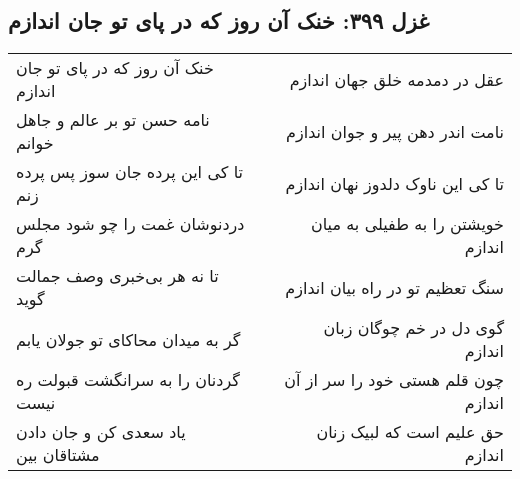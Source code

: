 \begin{center}
\section*{غزل ۳۹۹: خنک آن روز که در پای تو جان اندازم}
\label{sec:399}
\begin{longtable}{l p{0.5cm} r}
خنک آن روز که در پای تو جان اندازم
&&
عقل در دمدمه خلق جهان اندازم
\\
نامه حسن تو بر عالم و جاهل خوانم
&&
نامت اندر دهن پیر و جوان اندازم
\\
تا کی این پرده جان سوز پس پرده زنم
&&
تا کی این ناوک دلدوز نهان اندازم
\\
دردنوشان غمت را چو شود مجلس گرم
&&
خویشتن را به طفیلی به میان اندازم
\\
تا نه هر بی‌خبری وصف جمالت گوید
&&
سنگ تعظیم تو در راه بیان اندازم
\\
گر به میدان محاکای تو جولان یابم
&&
گوی دل در خم چوگان زبان اندازم
\\
گردنان را به سرانگشت قبولت ره نیست
&&
چون قلم هستی خود را سر از آن اندازم
\\
یاد سعدی کن و جان دادن مشتاقان بین
&&
حق علیم است که لبیک زنان اندازم
\\
\end{longtable}
\end{center}
